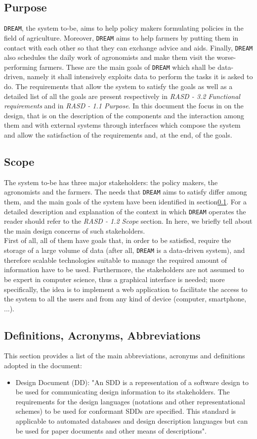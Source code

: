 \documentclass{article}
\begin{document}
\subsection{Purpose}\label{Purpose}
\verb|DREAM|, the system to-be, aims to help policy makers 
formulating policies in the field of agriculture.  Moreover, \verb|DREAM| aims to help farmers by putting them in contact with each other so that they can exchange advice and aids. Finally, \verb|DREAM| also schedules the daily work of agronomists and make them visit the worse-performing farmers. These are the main goals of \verb|DREAM| which shall be data-driven, namely it shall intensively exploits data to perform the tasks it is asked to do. The requirements that allow the system to satisfy the goals as well as a detailed list of all the goals are present respectively in \textit{RASD - 3.2 Functional requirements} and in \textit{RASD - 1.1 Purpose}. In this document the focus in on the design, that is on the description of the components and the interaction among them and with external systems through interfaces which compose the system and allow the satisfaction of the requirements and, at the end, of the goals.
\subsection{Scope}
The system to-be has three major stakeholders: the policy makers, the agronomists and the farmers. The needs that \verb|DREAM| aims to satisfy differ among them, and the main goals of the system have been identified in section\ref{Purpose}. For a detailed description and explanation of the context in which \verb|DREAM| operates the reader should refer to the \textit{RASD - 1.2 Scope} section. In here, we briefly tell about the main design concerns of such stakeholders.\\
First of all, all of them have goals that, in order to be satisfied, require the storage of a large volume of data (after all, \verb|DREAM| is a data-driven system), and therefore scalable technologies suitable to manage the required amount of information have to be used. Furthermore, the stakeholders are not assumed to be expert in computer science, thus a graphical interface is needed; more specifically, the idea is to implement a web application to facilitate the access to the system to all the users and from any kind of device (computer, smartphone, ...).
\subsection{Definitions, Acronyms, Abbreviations}\label{Abbreviations}
This section provides a list of the main abbreviations, acronyms and definitions adopted in the document:
\begin{itemize}
    \item Design Document (DD): "An SDD is a representation of a software design to be used for communicating design information to its stakeholders. The requirements for the design languages (notations and other representational schemes) to be used for conformant SDDs are specified.
This standard is applicable to automated databases and design description languages but can be
used for paper documents and other means of descriptions".
\end{itemize}
\end{document}
